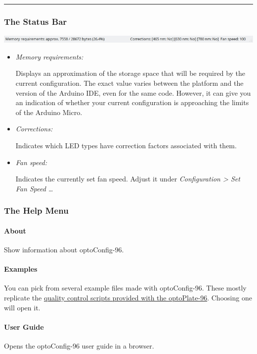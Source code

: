 \begin{center}\rule{0.5\linewidth}{0.5pt}\end{center}

\hypertarget{the-status-bar}{%
\subsubsection{The Status Bar}\label{the-status-bar}}

\includegraphics{images/statusbar.jpg}

\begin{itemize}
\item
  \emph{Memory requirements:}

  Displays an approximation of the storage space that will be required
  by the current configuration. The exact value varies between the
  platform and the version of the Arduino IDE, even for the same code.
  However, it can give you an indication of whether your current
  configuration is approaching the limits of the Arduino Micro.
\item
  \emph{Corrections:}

  Indicates which LED types have correction factors associated with
  them.
\item
  \emph{Fan speed:}

  Indicates the currently set fan speed. Adjust it under
  \emph{Configuration \textgreater{} Set Fan Speed \ldots{}}
\end{itemize}

\hypertarget{the-help-menu}{%
\subsubsection{The Help Menu}\label{the-help-menu}}

\hypertarget{about}{%
\paragraph{About}\label{about}}

Show information about optoConfig-96.

\hypertarget{examples}{%
\paragraph{Examples}\label{examples}}

You can pick from several example files made with optoConfig-96. These
mostly replicate the
\href{https://github.com/BugajLab/optoPlate-96/tree/master/2.\%20Code/1.\%20Arduino/2.\%20QCscripts}{quality
control scripts provided with the optoPlate-96}. Choosing one will open
it.

\hypertarget{user-guide}{%
\paragraph{User Guide}\label{user-guide}}

Opens the optoConfig-96 user guide in a browser.
